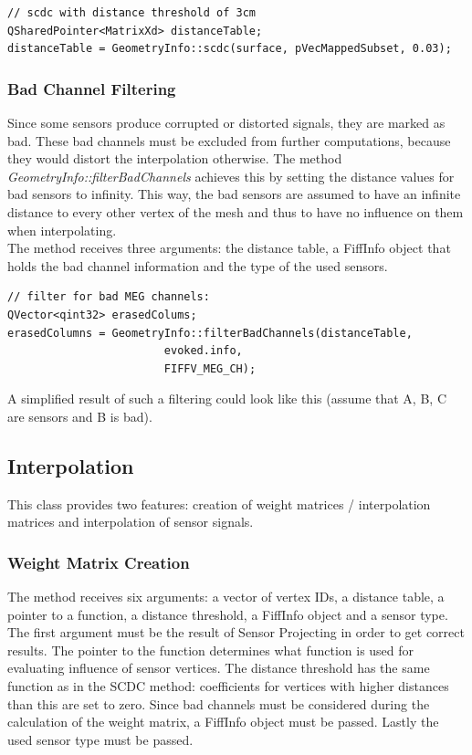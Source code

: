 \begin{lstlisting}
// scdc with distance threshold of 3cm
QSharedPointer<MatrixXd> distanceTable;
distanceTable = GeometryInfo::scdc(surface, pVecMappedSubset, 0.03);
\end{lstlisting}

\subsubsection{Bad Channel Filtering}

Since some sensors produce corrupted or distorted signals, they are marked as bad. These bad channels must be excluded from further computations, because they would distort the interpolation otherwise. The method \textit{GeometryInfo::filterBadChannels} achieves this by setting the distance values for bad sensors to infinity. This way, the bad sensors are assumed to have an infinite distance to every other vertex of the mesh and thus to have no influence on them when interpolating.\\
The method receives three arguments: the distance table, a FiffInfo object that holds the bad channel information and the type of the used sensors.

\begin{lstlisting}
// filter for bad MEG channels:
QVector<qint32> erasedColums;
erasedColumns = GeometryInfo::filterBadChannels(distanceTable,
						evoked.info,
						FIFFV_MEG_CH);
\end{lstlisting}

A simplified result of such a filtering could look like this (assume that A, B, C are sensors and B is bad).


\subsection{Interpolation}

This class provides two features: creation of weight matrices / interpolation matrices and interpolation of sensor signals.

\subsubsection{Weight Matrix Creation}

The method  receives six arguments: a vector of vertex IDs, a distance table, a pointer to a function, a distance threshold, a FiffInfo object and a sensor type. The first argument must be the result of Sensor Projecting in order to get correct results. The pointer to the function determines what function is used for evaluating influence of sensor vertices. The distance threshold has the same function as in the SCDC method: coefficients for vertices with higher distances than this are set to zero. Since bad channels must be considered during the calculation of the weight matrix, a FiffInfo object must be passed. Lastly the used sensor type must be passed. 

